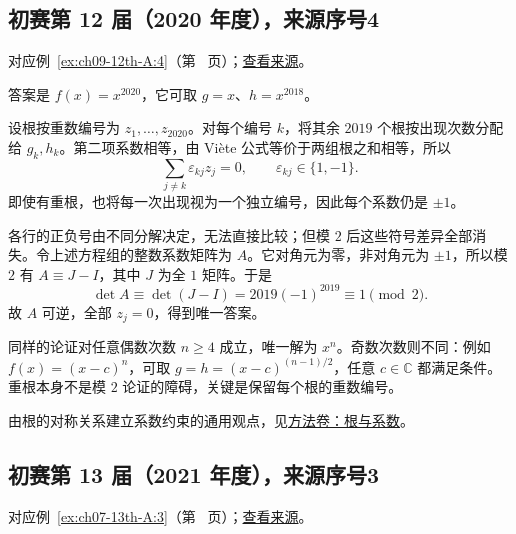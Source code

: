 \documentclass[UTF8,12pt,a4paper,fontset=fandol]{ctexart}
\begin{document}
\subsection{初赛第 12 届（2020 年度），来源序号4}\label{ans:ch09-12th-A:4}\label{pr:ch09-12th-A:4}

对应例~\ref{ex:ch09-12th-A:4}（第~\pageref{ex:ch09-12th-A:4} 页）；\href{https://github.com/lzxcr/cmc-mathematics/blob/64916fa1fdbc3e444a652eca204d5669058ee321/src/problems/preliminary/12/04.md}{查看来源}。

\begin{solve}

答案是 $f(x)=x^{2020}$，它可取 $g=x$、$h=x^{2018}$。

设根按重数编号为 $z_1,\ldots,z_{2020}$。对每个编号 $k$，将其余 $2019$ 个根按出现次数分配给 $g_k,h_k$。第二项系数相等，由 Viète 公式等价于两组根之和相等，所以
\[
\sum_{j\neq k}\varepsilon_{kj}z_j=0,
\qquad \varepsilon_{kj}\in\{1,-1\}.
\]
即使有重根，也将每一次出现视为一个独立编号，因此每个系数仍是 $\pm1$。

各行的正负号由不同分解决定，无法直接比较；但模 $2$ 后这些符号差异全部消失。令上述方程组的整数系数矩阵为 $A$。它对角元为零，非对角元为 $\pm1$，所以模 $2$ 有 $A\equiv J-I$，其中 $J$ 为全 $1$ 矩阵。于是
\[
\det A\equiv\det(J-I)
=2019(-1)^{2019}\equiv1\pmod2.
\]
故 $A$ 可逆，全部 $z_j=0$，得到唯一答案。

\end{solve}

\begin{remark}[方法与条件]

同样的论证对任意偶数次数 $n\geq4$ 成立，唯一解为 $x^n$。奇数次数则不同：例如 $f(x)=(x-c)^n$，可取 $g=h=(x-c)^{(n-1)/2}$，任意 $c\in\mathbb C$ 都满足条件。重根本身不是模 $2$ 论证的障碍，关键是保留每个根的重数编号。

由根的对称关系建立系数约束的通用观点，见\hyperref[app:algebra-roots]{方法卷：根与系数}。

\end{remark}

\subsection{初赛第 13 届（2021 年度），来源序号3}\label{ans:ch07-13th-A:3}\label{pr:ch07-13th-A:3}

对应例~\ref{ex:ch07-13th-A:3}（第~\pageref{ex:ch07-13th-A:3} 页）；\href{https://github.com/lzxcr/cmc-mathematics/blob/64916fa1fdbc3e444a652eca204d5669058ee321/src/problems/preliminary/13/03.md}{查看来源}。
\end{document}
